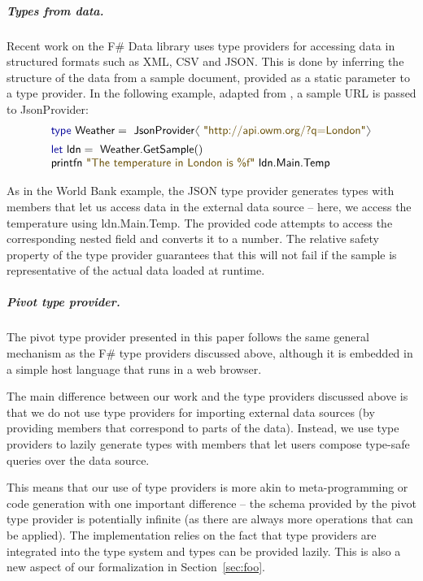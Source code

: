 \documentclass[a4paper,UKenglish]{lipics-v2016}
\theoremstyle{plain}
\theoremstyle{definition}
\newcommand{\langl}{\begin{picture}(4.5,7)
\put(1.1,2.5){\rotatebox{60}{\line(1,0){5.5}}}
\put(1.1,2.5){\rotatebox{300}{\line(1,0){5.5}}}
\end{picture}}
\newcommand{\rangl}{\begin{picture}(4.5,7)
\put(.9,2.5){\rotatebox{120}{\line(1,0){5.5}}}
\put(.9,2.5){\rotatebox{240}{\line(1,0){5.5}}}
\end{picture}}
\newcommand{\str}[1]{\textnormal{\textcolor{strclr}{\sffamily "#1"}}}
\newcommand{\kvd}[1]{\textnormal{\textcolor{kvdclr}{\sffamily #1}}}
\newcommand{\ident}[1]{\textnormal{\sffamily #1}}
\begin{document}
\subparagraph{Types from data.} Recent work on the F\# Data library \cite{fsdata} uses type providers for 
accessing data in structured formats such as XML, CSV and JSON. This is done by inferring the 
structure of the data from a sample document, provided as a static parameter to a type provider.
In the following example, adapted from \cite{fsdata}, a sample URL is passed to \ident{JsonProvider}:
%
\begin{equation*}
\begin{array}{l}
 \kvd{type}~\ident{Weather} = \ident{JsonProvider}\langl\str{http://api.owm.org/?q=London}\rangl \\[0.5em]
 \kvd{let}~\ident{ldn} = \ident{Weather.GetSample}()\\
 \ident{printfn}~\str{The temperature in London is \%f}~\ident{ldn.Main.Temp}
\end{array}
\end{equation*}

\noindent
As in the World Bank example, the JSON type provider generates types with members that let us access
data in the external data source -- here, we access the temperature using \ident{ldn.Main.Temp}. 
The provided code attempts to access the corresponding nested field and converts it to a number.
The relative safety property of the type provider guarantees that this will not fail if the sample 
is representative of the actual data loaded at runtime.
    
\subparagraph{Pivot type provider.} The pivot type provider presented in this paper follows the 
same general mechanism as the F\# type providers discussed above, although it is embedded in a 
simple host language that runs in a web browser. 

The main difference between our work and the type providers discussed above is that we do not use
type providers for importing external data sources (by providing members that correspond to parts 
of the data). Instead, we use type providers to lazily generate types with members that let 
users compose type-safe queries over the data source.

This means that our use of type providers is more akin to meta-programming or code generation with
one important difference -- the schema provided by the pivot type provider is potentially infinite
(as there are always more operations that can be applied). The implementation relies on the fact 
that type providers are integrated into the type system and types can be provided lazily. This is 
also a new aspect of our formalization in Section~\ref{sec:foo}.
\end{document}
